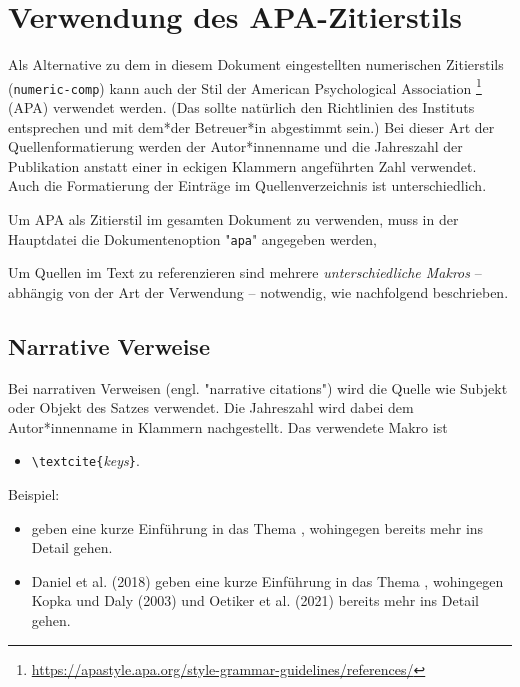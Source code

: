 \section{Verwendung des APA-Zitierstils}

\begin{sloppypar}
Als Alternative zu dem in diesem Dokument eingestellten numerischen
Zitierstils (\texttt{numeric-comp}) kann auch der Stil der American
Psychological Association%
\footnote{\url{https://apastyle.apa.org/style-grammar-guidelines/references/}}
(APA) verwendet werden. (Das sollte natürlich den Richtlinien des Instituts
entsprechen und mit dem*der Betreuer*in abgestimmt sein.) Bei dieser Art der
Quellenformatierung werden der Autor*innenname und die Jahreszahl der
Publikation anstatt einer in eckigen Klammern angeführten Zahl verwendet.
Auch die Formatierung der Einträge im Quellenverzeichnis ist unterschiedlich.
\end{sloppypar}

Um APA als Zitierstil im gesamten Dokument zu verwenden, muss in der
Hauptdatei die Dokumenten\-option "\texttt{apa}" angegeben werden, \zB
%
%
Um Quellen im Text zu referenzieren sind mehrere \emph{unterschiedliche
Makros} -- abhängig von der Art der Verwendung -- notwendig, wie nachfolgend
beschrieben.


\subsection{Narrative Verweise}

Bei narrativen Verweisen (engl. "narrative citations") wird die Quelle wie
Subjekt oder Objekt des Satzes verwendet. Die Jahreszahl wird dabei dem
Autor*innenname in Klammern nachgestellt. Das verwendete Makro ist
%
\begin{itemize}
    \item[] \verb!\textcite{!\textit{keys}\verb!}!.
\end{itemize}
%
Beispiel:
%
\begin{itemize}
\item[]
\begin{LaTeXCode}[numbers=none,breakindent=0pt]
\textcite{Daniel2018} geben eine kurze Einführung in das Thema \latex,
wohingegen \textcite{Oetiker2021, Kopka2003} bereits mehr ins Detail gehen.
\end{LaTeXCode}
\item[]
    Daniel et al. (2018) geben eine kurze Einführung in das Thema \latex,
    wohingegen Kopka und Daly (2003) und Oetiker et al. (2021) bereits mehr ins
    Detail gehen.
\end{itemize}


